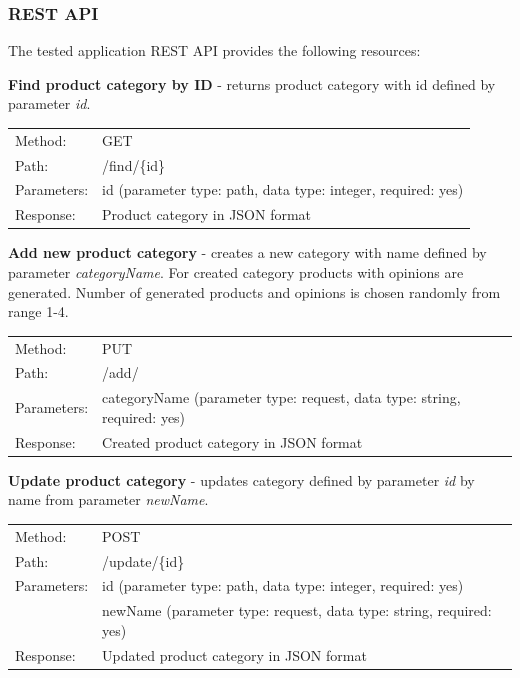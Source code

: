 \documentclass[12pt,a4paper]{article}
\begin{document}
\subsubsection{REST API} 
The tested application REST API provides the following resources:
\vspace{3mm}

\noindent\textbf{Find product category by ID} - returns product category with id defined by parameter \textit{id}.

{\renewcommand{\arraystretch}{1}
  \begin{tabular}{ll}
  Method: & GET\\
  Path: & /find/\{id\}\\
  Parameters: & id (parameter type: path, data type: integer, required: yes)\\
  Response: & Product category in JSON format \\
  \end{tabular} \vspace{5mm}
}

\noindent\textbf{Add new product category} - creates a new category with name defined by parameter \textit{categoryName}. For created category products with opinions are generated. Number of generated products and opinions is chosen randomly from range 1-4. 

{\renewcommand{\arraystretch}{1}
  \begin{tabular}{ll}
  Method: & PUT \\
  Path: & /add/ \\
  Parameters: & categoryName (parameter type: request, data type: string, required: yes)\\
  Response: & Created product category in JSON format  \\
  \end{tabular} \vspace{5mm}
}

\noindent\textbf{Update product category} - updates category defined by parameter \textit{id} by name from parameter \textit{newName}. 

{\renewcommand{\arraystretch}{1}
  \begin{tabular}{ll}
  Method: & POST \\
  Path: & /update/\{id\} \\
  Parameters: & id (parameter type: path, data type: integer, required: yes)\\
              & newName (parameter type: request, data type: string, required: yes)\\
  Response: & Updated product category in JSON format  \\
  \end{tabular} \vspace{5mm}
}
\end{document}
